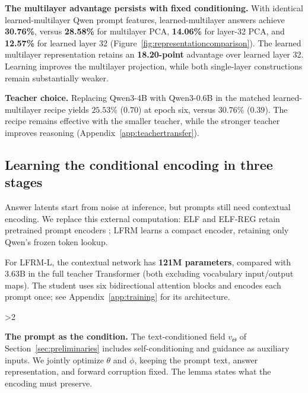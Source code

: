\documentclass{article}
\newcommand{\rev}[1]{{\color{blue}#1}}
\newcommand{\revp}[1]{\par\color{blue}#1\par\color{black}}
\begin{document}
\revp{\textbf{The multilayer advantage persists with fixed conditioning.} With identical learned-multilayer Qwen prompt features, learned-multilayer answers achieve \textbf{30.76\%}, versus \textbf{28.58\%} for multilayer PCA, \textbf{14.06\%} for layer-32 PCA, and \textbf{12.57\%} for learned layer 32 (Figure~\ref{fig:representationcomparison}). The learned multilayer representation retains an \textbf{18.20-point} advantage over learned layer 32. Learning improves the multilayer projection, while both single-layer constructions remain substantially weaker.}

\revp{\textbf{Teacher choice.} Replacing Qwen3-4B with Qwen3-0.6B in the matched learned-multilayer recipe yields $25.53\%$ ($0.70$) at epoch six, versus $30.76\%$ ($0.39$). The recipe remains effective with the smaller teacher, while the stronger teacher improves reasoning (Appendix~\ref{app:teachertransfer}).}


\subsection{Learning the conditional encoding in three stages}
\label{sec:conditionalencoding}

\revp{Answer latents start from noise at inference, but prompts still need contextual encoding. \rev{We replace this external computation:} ELF and ELF-REG retain pretrained prompt encoders \rev{\citep{elf,scalingdlm}; LFRM learns a compact encoder, retaining only Qwen's frozen token lookup.}} For LFRM-L, the contextual network has \textbf{121M parameters}, compared with 3.63B in the full teacher Transformer (both excluding vocabulary input/output maps). The student uses six bidirectional attention blocks and encodes each prompt once; see Appendix~\ref{app:training} for its architecture.

\par
\ifnum\value{WF@wrappedlines}>2
  \vspace{\dimexpr\value{WF@wrappedlines}\baselineskip-2\baselineskip\relax}
\fi
\WFclear

\textbf{The prompt as the condition.}
The text-conditioned field $v_\Theta$ of Section~\ref{sec:preliminaries} includes self-conditioning and guidance as auxiliary inputs. We jointly optimize $\theta$ and $\phi$, keeping the prompt text, answer representation, and forward corruption fixed. \rev{The lemma states what the encoding must preserve.}
\end{document}
